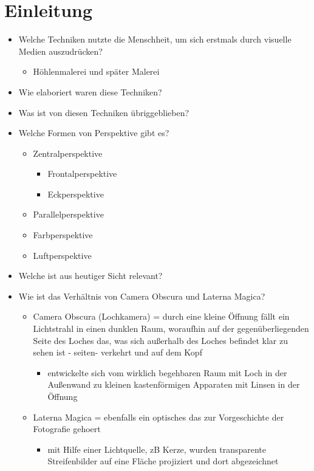 \documentclass[11pt]{article}
\author{John Doe}
\date{\today}
\title{}
\begin{document}
\tableofcontents

\section{Einleitung}
\label{sec:org09cd19a}
\begin{itemize}
\item Welche Techniken nutzte die Menschheit, um sich erstmals durch visuelle Medien auszudrücken?
\begin{itemize}
\item Höhlenmalerei und später Malerei
\end{itemize}
\item Wie elaboriert waren diese Techniken?
\item Was ist von diesen Techniken übriggeblieben?
\item Welche Formen von Perspektive gibt es?
\begin{itemize}
\item Zentralperspektive
\begin{itemize}
\item Frontalperspektive
\item Eckperspektive
\end{itemize}
\item Parallelperspektive
\item Farbperspektive
\item Luftperspektive
\end{itemize}
\item Welche ist aus heutiger Sicht relevant?
\item Wie ist das Verhältnis von Camera Obscura und Laterna Magica?
\begin{itemize}
\item Camera Obscura (Lochkamera) = durch eine kleine Öffnung fällt ein Lichtstrahl in einen dunklen Raum, woraufhin auf der gegenüberliegenden Seite des Loches das, was sich außerhalb des Loches befindet klar zu sehen ist - seiten- verkehrt und auf dem Kopf
\begin{itemize}
\item entwickelte sich vom wirklich begehbaren Raum mit Loch in der Außenwand zu kleinen kastenförmigen Apparaten mit Linsen in der Öffnung
\end{itemize}
\item Laterna Magica = ebenfalls ein optisches das zur Vorgeschichte der Fotografie gehoert
\begin{itemize}
\item mit Hilfe einer Lichtquelle, zB Kerze, wurden transparente Streifenbilder auf eine Fläche projiziert und dort abgezeichnet

\end{itemize}
\end{itemize}
\end{itemize}
\end{document}
